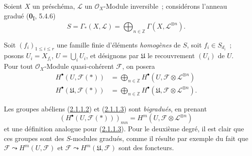 \begin{env}[2.1.1]
\label{III.2.1.1-fr}
Soient $X$ un préschéma, $\mathcal L$ un $\mathcal O_X$-Module inversible~;
considérons l'anneau gradué (\textbf{0}\textsubscript{I}, 5.4.6)
\begin{equation}
\label{III.2.1.1.1-fr}
\tag{2.1.1.1}
S=\Gamma_*(X,\mathcal L)
=\bigoplus_{n\in\mathbb Z}\Gamma(X,\mathcal L^{\otimes n}).
\end{equation}

Soit $(f_i)_{1\leq i\leq r}$ une famille finie d'éléments \emph{homogènes}
de $S$, soit $f_i\in S_{d_i}$~; posons
$U_i=X_{f_i}$, $U=\bigcup_iU_i$, et désignons par $\mathfrak U$ le
recouvrement $(U_i)$ de $U$. Pour tout $\mathcal O_X$-Module quasi-cohérent
$\mathcal F$, on posera
\begin{align}
\label{III.2.1.1.2-fr}
\tag{2.1.1.2}
H^\bullet(U,\mathcal F(*))
&=\bigoplus_{n\in\mathbb Z}
H^\bullet(U,\mathcal F\otimes\mathcal L^{\otimes n})\\
\label{III.2.1.1.3-fr}
\tag{2.1.1.3}
H^\bullet(\mathfrak U,\mathcal F(*))
&=\bigoplus_{n\in\mathbb Z}
H^\bullet(\mathfrak U,\mathcal F\otimes\mathcal L^{\otimes n}).
\end{align}

Les groupes abéliens (\hyperref[III.2.1.1.2-fr]{2.1.1.2}) et
(\hyperref[III.2.1.1.3-fr]{2.1.1.3}) sont \emph{bigradués}, en prenant
\[
(H^\bullet(U,\mathcal F(*)))_{mn}
=H^m(U,\mathcal F\otimes\mathcal L^{\otimes n})
\]
et une définition analogue pour
(\hyperref[III.2.1.1.3-fr]{2.1.1.3}). Pour le deuxième degré, il est clair
que ces groupes sont des $S$-modules gradués, comme il résulte par exemple du
fait que $\mathcal F\leadsto H^m(U,\mathcal F)$ et
$\mathcal F\leadsto H^m(\mathfrak U,\mathcal F)$ sont des foncteurs.
\end{env}

